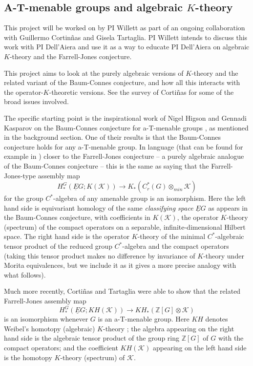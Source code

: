 \documentclass[11pt]{article}
\newcommand{\Z}{\mathbb{Z}}
\theoremstyle{plain}
\theoremstyle{definition}
\theoremstyle{remark}
\begin{document}


\subsection{A-T-menable groups and algebraic $K$-theory}\label{atmen}



This project will be worked on by PI Willett as part of an ongoing collaboration with Guillermo Cortin\~{n}as and Gisela Tartaglia.  PI Willett intends to discuss this work with PI Dell'Aiera and use it as a way to educate PI Dell'Aiera on algebraic $K$-theory and the Farrell-Jones conjecture.

This project aims to look at the purely algebraic versions of $K$-theory and the related variant of the Baum-Connes conjecture, and how all this interacts with the operator-$K$-theoretic versions.  See the survey \cite{Cortinas:2008aa} of Corti\~{n}as for some of the broad issues involved.

The specific starting point is the inspirational work of Nigel Higson and Gennadi Kasparov on the Baum-Connes conjecture for a-T-menable groups \cite{Higson:2001eb}, as mentioned in the background section.  One of their results is that the Baum-Connes conjecture holds for any a-T-menable group.  In language (that can be found for example in \cite{Davis:1998qf}) closer to the Farrell-Jones conjecture -- a purely algebraic analogue of the Baum-Connes conjecture -- this is the same as saying that the Farrell-Jones-type assembly map
 $$
 H^G_*(\underline{E}G;K(\mathcal{K})) \to K_*(C^*_r(G)\otimes_{min} \mathcal{K})
 $$
for the group $C^*$-algebra of any amenable group is an isomorphism.  Here the left hand side is equivariant homology of the same \emph{classifying space} $\underline{E}G$ as appears in the Baum-Connes conjecture, with coefficients in $K(\mathcal{K})$,  the operator $K$-theory (spectrum) of the compact operators on a separable, infinite-dimensional Hilbert space.  The right hand side is the operator $K$-theory of the minimal $C^*$-algebraic tensor product of the reduced group $C^*$-algebra and the compact operators (taking this tensor product makes no difference by invariance of $K$-theory under Morita equivalences, but we include it as it gives a more precise analogy with what follows).
 
 Much more recently, Corti\~{n}as and Tartaglia were able to show that the related Farrell-Jones assembly map 
 \begin{equation}\label{k iso}
 H^G_*(\underline{E}G;KH(\mathcal{K})) \to KH_*(\Z[G]\otimes \mathcal{K})
 \end{equation}
is an isomorphism whenever $G$ is an a-T-menable group.  Here $KH$ denotes Weibel's homotopy (algebraic) $K$-theory \cite[Section IV.12]{Weibel:2013bf}; the algebra appearing on the right hand side is the algebraic tensor product of the group ring $\Z[G]$ of $G$ with the compact operators; and the coefficient $KH(\mathcal{K})$ appearing on the left hand side is the homotopy $K$-theory (spectrum) of $\mathcal{K}$.  
 
\end{document}
